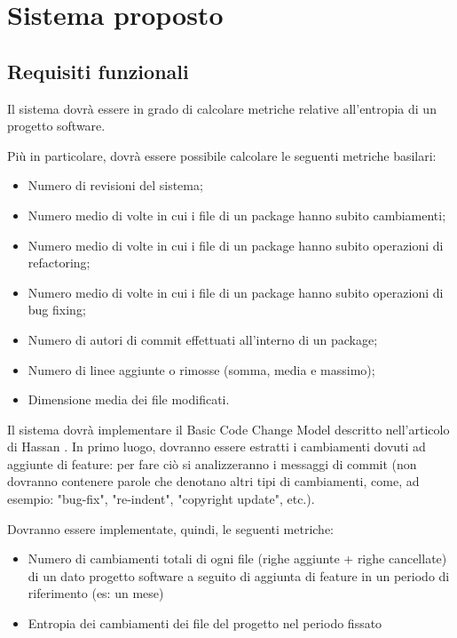 \chapter{Sistema proposto}
\section{Requisiti funzionali}\label{req_fun}
Il sistema dovrà essere in grado di calcolare metriche relative all'entropia di un progetto software.

Più in particolare, dovrà essere possibile calcolare le seguenti metriche basilari:
\begin{itemize}
\item Numero di revisioni del sistema;
\item Numero medio di volte in cui i file di un package hanno subito
cambiamenti;
\item Numero medio di volte in cui i file di un package hanno subito operazioni
di refactoring;
\item Numero medio di volte in cui i file di un package hanno subito operazioni di
bug fixing;
\item Numero di autori di commit effettuati all’interno di un package;
\item Numero di linee aggiunte o rimosse (somma, media e massimo);
\item Dimensione media dei file modificati.
\end{itemize}

Il sistema dovrà implementare il Basic Code Change Model descritto nell'articolo di Hassan \cite{hassan2009predicting}.
In primo luogo, dovranno essere estratti i cambiamenti dovuti ad aggiunte di feature: per fare ciò si analizzeranno i messaggi di commit (non dovranno contenere parole che denotano altri tipi di cambiamenti, come, ad esempio: "bug-fix", "re-indent", "copyright update", etc.).

Dovranno essere implementate, quindi, le seguenti metriche:
\begin{itemize}
\item Numero di cambiamenti totali di ogni file (righe aggiunte + righe cancellate) di un dato progetto software a seguito di aggiunta di feature in un periodo di riferimento (es: un mese)
\item Entropia dei cambiamenti dei file del progetto nel periodo fissato
\end{itemize}

